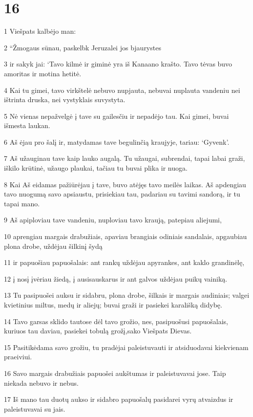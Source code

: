 \chapter{16}


\par 1 Viešpats kalbėjo man: 
\par 2 “Žmogaus sūnau, paskelbk Jeruzalei jos bjaurystes 
\par 3 ir sakyk jai: ‘Tavo kilmė ir giminė yra iš Kanaano krašto. Tavo tėvas buvo amoritas ir motina hetitė. 
\par 4 Kai tu gimei, tavo virkštelė nebuvo nupjauta, nebuvai nuplauta vandeniu nei ištrinta druska, nei vystyklais suvystyta. 
\par 5 Nė vienas nepažvelgė į tave su gailesčiu ir nepadėjo tau. Kai gimei, buvai išmesta laukan. 
\par 6 Aš ėjau pro šalį ir, matydamas tave begulinčią kraujyje, tariau: ‘Gyvenk’. 
\par 7 Aš užauginau tave kaip lauko augalą. Tu užaugai, subrendai, tapai labai graži, iškilo krūtinė, užaugo plaukai, tačiau tu buvai plika ir nuoga. 
\par 8 Kai Aš eidamas pažiūrėjau į tave, buvo atėjęs tavo meilės laikas. Aš apdengiau tavo nuogumą savo apsiaustu, prisiekiau tau, padariau su tavimi sandorą, ir tu tapai mano. 
\par 9 Aš apiploviau tave vandeniu, nuploviau tavo kraują, patepiau aliejumi, 
\par 10 aprengiau margais drabužiais, apaviau brangiais odiniais sandalais, apgaubiau plona drobe, uždėjau šilkinį šydą 
\par 11 ir papuošiau papuošalais: ant rankų uždėjau apyrankes, ant kaklo grandinėlę, 
\par 12 į nosį įvėriau žiedą, į ausis­auskarus ir ant galvos uždėjau puikų vainiką. 
\par 13 Tu pasipuošei auksu ir sidabru, plona drobe, šilkais ir margais audiniais; valgei kvietinius miltus, medų ir aliejų; buvai graži ir pasiekei karališką didybę. 
\par 14 Tavo garsas sklido tautose dėl tavo grožio, nes, pasipuošusi papuošalais, kuriuos tau daviau, pasiekei tobulą grožį,­sako Viešpats Dievas.­ 
\par 15 Pasitikėdama savo grožiu, tu pradėjai paleistuvauti ir atsiduodavai kiekvienam praeiviui. 
\par 16 Savo margais drabužiais papuošei aukštumas ir paleistuvavai jose. Taip niekada nebuvo ir nebus. 
\par 17 Iš mano tau duotų aukso ir sidabro papuošalų pasidarei vyrų atvaizdus ir paleistuvavai su jais. 

